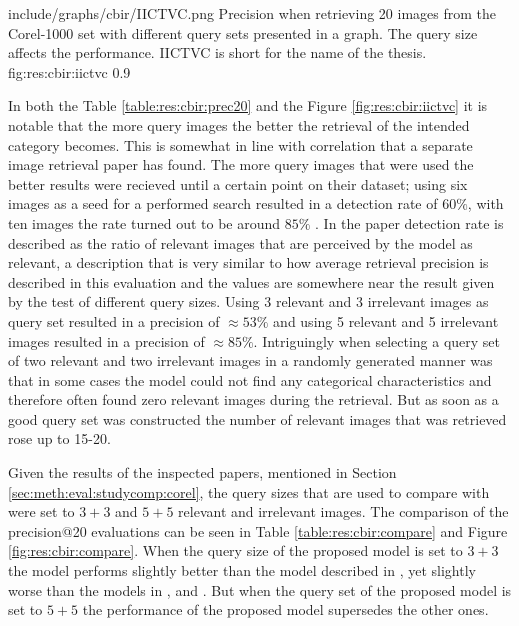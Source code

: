 \singlefigurenear
{include/graphs/cbir/IICTVC.png}
{Precision when retrieving 20 images from the Corel-1000 set with different query sets presented in a graph. The query size affects the performance. IICTVC is short for the name of the thesis.}
{fig:res:cbir:iictvc}
{0.9}

In both the Table \ref{table:res:cbir:prec20} and the Figure \ref{fig:res:cbir:iictvc} it is notable that the more query images the better the retrieval of the intended category becomes. This is somewhat in line with correlation that a separate image retrieval paper has found. The more query images that were used the better results were recieved until a certain point on their dataset; using six images as a seed for a performed search resulted in a detection rate of $60\%$, with ten images the rate turned out to be around $85\%$ \cite{li2010optimol}. In the paper detection rate is described as the ratio of relevant images that are perceived by the model as relevant, a description that is very similar to how average retrieval precision is described in this evaluation and the values are somewhere near the result given by the test of different query sizes. Using 3 relevant and 3 irrelevant images as query set resulted in a precision of $\approx53\%$ and using 5 relevant and 5 irrelevant images resulted in a precision of $\approx85\%$. Intriguingly when selecting a query set of two relevant and two irrelevant images in a randomly generated manner was that in some cases the model could not find any categorical characteristics and therefore often found zero relevant images during the retrieval. But as soon as a good query set was constructed the number of relevant images that was retrieved rose up to 15-20. 



Given the results of the inspected papers, mentioned in Section \ref{sec:meth:eval:studycomp:corel}, the query sizes that are used to compare with were set to $3+3$ and $5+5$ relevant and irrelevant images. The comparison of the precision@20 evaluations can be seen in Table \ref{table:res:cbir:compare} and Figure \ref{fig:res:cbir:compare}. When the query size of the proposed model is set to $3+3$ the model performs slightly better than the model described in \cite{wang2001simplicity}, yet slightly worse than the models in \cite{subrahmanyam2013modified}, \cite{nagaraja2015low} and \cite{elalami2014new}. But when the query set of the proposed model is set to $5+5$ the performance of the proposed model supersedes the other ones. 


